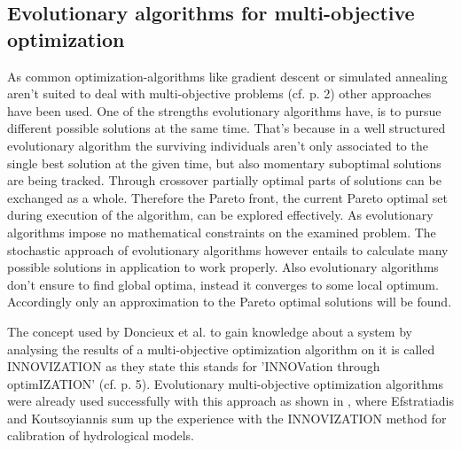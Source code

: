 \documentclass[12pt,twoside]{article}
\theoremstyle{plain}
\theoremstyle{definition}
\theoremstyle{remark}
\begin{document}
\subsection{Evolutionary algorithms for multi-objective optimization}
\label{back:evo_in_multi-opt}
As common optimization-algorithms like gradient descent or simulated annealing aren't suited to deal with multi-objective problems (cf. \cite{fonseca1995overview} p. 2) other approaches have been used.
One of the strengths evolutionary algorithms have, is to pursue different possible solutions at the same time. That's because in a well structured evolutionary algorithm the surviving individuals aren't only associated to the single best solution at the given time, but also momentary suboptimal solutions are being tracked.
Through crossover partially optimal parts of solutions can be exchanged as a whole. 
Therefore the Pareto front, the current Pareto optimal set during execution of the algorithm, can be explored effectively.
As evolutionary algorithms impose no mathematical constraints on the examined problem. The stochastic approach of evolutionary algorithms however entails to calculate many possible solutions in application to work properly. Also evolutionary algorithms don't ensure to find global optima, instead it converges to some local optimum. Accordingly only an approximation to the Pareto optimal solutions will be found.

The concept used by Doncieux et al. to gain knowledge about a system by analysing the results of a multi-objective optimization algorithm on it is called INNOVIZATION as they state this stands for 'INNOVation through optimIZATION' (cf. \cite{doncieux2015multi} p. 5).
Evolutionary multi-objective optimization algorithms were already used successfully with this approach as shown in \cite{efstratiadis2010one}, where Efstratiadis and Koutsoyiannis sum up the experience with the INNOVIZATION method for calibration of hydrological models.
\end{document}
